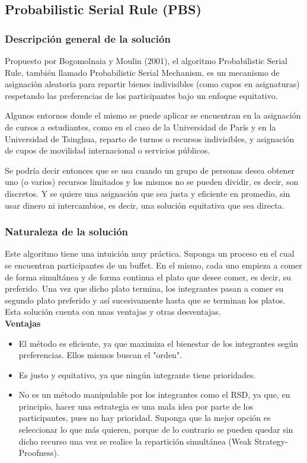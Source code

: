 \documentclass{article}
\begin{document}
\subsection{Probabilistic Serial Rule (PBS)}

\subsubsection{Descripción general de la solución}

Propuesto por Bogomolnaia y Moulin (2001), el algoritmo Probabilistic Serial Rule, también llamado 
Probabilistic Serial Mechanism, es un 
mecanismo de asignación aleatoria para repartir bienes indivisibles (como cupos en asignaturas) 
respetando las preferencias de los participantes bajo un enfoque equitativo.

Algunos entornos donde el mismo se puede aplicar se encuentran en la asignación de cursos a estudiantes,
como en el caso de la Universidad de París y en la Universidad de Tsinghua, reparto de turnos o 
recursos indivisibles, y asignación de cupos de movilidad internacional o servicios públicos.

Se podría decir entonces que se usa cuando un grupo de personas desea obtener uno (o varios) 
recursos limitados y los mismos no se pueden dividir, es decir, son discretos. Y se quiere una 
asignación que sea justa y eficiente en promedio, sin usar dinero ni intercambios, es decir, una 
solución equitativa que sea directa.

\subsubsection{Naturaleza de la solución}

Este algoritmo tiene una intuición muy práctica. Suponga un proceso en el cual se encuentran 
participantes de un buffet. En el mismo, cada uno empieza a comer de forma simultánea y de 
forma continua el plato que desee comer, es decir, su preferido. Una vez que dicho plato termina,
los integrantes pasan a comer su segundo plato preferido y así sucesivamente hasta que se terminan 
los platos.\\

Esta solución cuenta con unas ventajas y otras desventajas.\\

\textbf{Ventajas}

\begin{itemize}
  \item El método es eficiente, ya que maximiza el bienestar de los integrantes según preferencias.
        Ellos mismos buscan el "orden".
  \item Es justo y equitativo, ya que ningún integrante tiene prioridades.
  \item No es un método manipulable por los integrantes como el RSD, ya que, en principio, hacer una 
        estrategia es una mala idea por parte de los participantes, pues no hay prioridad. Suponga que
        la mejor opción es seleccionar lo que más quieren, porque de lo contrario se pueden quedar sin 
        dicho recurso una vez se realice la repartición simultánea (Weak Strategy-Proofness).
\end{itemize}
\end{document}
